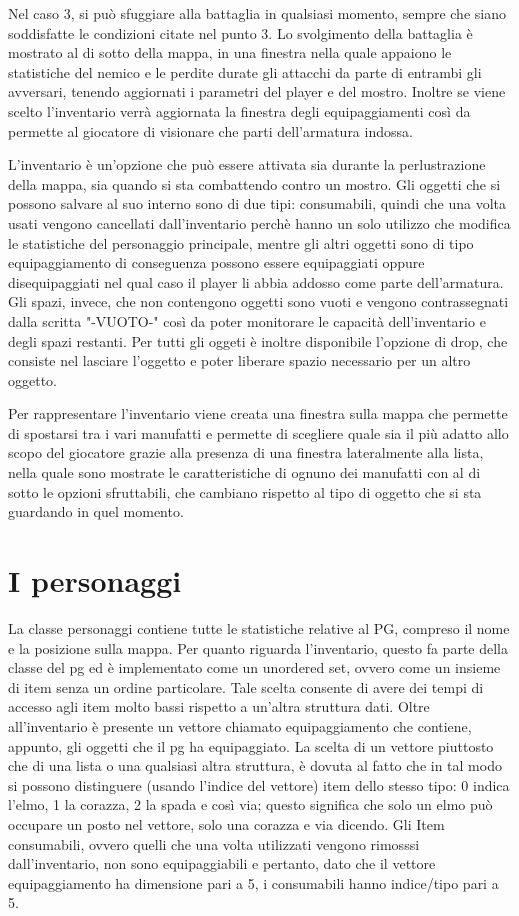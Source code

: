 \documentclass[10pt]{report}
\begin{document}
Nel caso 3, si può sfuggiare alla battaglia in qualsiasi momento, sempre che siano soddisfatte le condizioni citate nel
punto 3.  Lo svolgimento della battaglia è mostrato al di sotto della mappa, in una finestra nella quale appaiono le
statistiche del nemico e le perdite durate gli attacchi da parte di entrambi gli avversari, tenendo aggiornati i
parametri del player e del mostro. Inoltre se viene scelto l'inventario verrà aggiornata la finestra degli
equipaggiamenti così da permette al giocatore di visionare che parti dell'armatura indossa. 

L'inventario è un'opzione che può essere attivata sia durante la perlustrazione della mappa, sia quando si sta
combattendo contro un mostro. Gli oggetti che si possono salvare al suo interno sono di due tipi: consumabili, quindi
che una volta usati vengono cancellati dall'inventario perchè hanno un solo utilizzo che modifica le statistiche del
personaggio principale, mentre gli altri oggetti sono di tipo equipaggiamento di conseguenza possono essere equipaggiati
oppure disequipaggiati nel qual caso il player li abbia addosso come parte dell'armatura. Gli spazi, invece, che non
contengono oggetti sono vuoti e vengono contrassegnati dalla scritta "-VUOTO-" così da poter monitorare le capacità
dell'inventario e degli spazi restanti. Per tutti gli oggeti è inoltre disponibile l'opzione di drop, che consiste nel
lasciare l'oggetto e poter liberare spazio necessario per un altro oggetto. 

Per rappresentare l'inventario viene creata una finestra sulla mappa che permette di spostarsi tra i vari manufatti e
permette di scegliere quale sia il più adatto allo scopo del giocatore grazie alla presenza di una finestra lateralmente
alla lista, nella quale sono mostrate le caratteristiche di ognuno dei manufatti con al di sotto le opzioni sfruttabili,
che cambiano rispetto al tipo di oggetto che si sta guardando in quel momento.

\section{I personaggi}

La classe personaggi contiene tutte le statistiche relative al PG, compreso il nome e la posizione sulla
mappa. 
Per quanto riguarda l'inventario, questo fa parte della classe del pg ed è implementato come un 
unordered set, ovvero come un insieme di item senza un ordine particolare. Tale scelta consente di avere
dei tempi di accesso agli item molto bassi rispetto a un'altra struttura dati. 
Oltre all'inventario è presente un vettore chiamato equipaggiamento che contiene, appunto,
gli oggetti che il pg ha equipaggiato. La scelta di un vettore piuttosto che di una lista o una qualsiasi
altra struttura, è dovuta al fatto che in tal modo si possono distinguere (usando l'indice del vettore) 
item dello stesso tipo: 0 indica l'elmo, 1 la corazza, 2 la spada e così via; questo significa che solo
un elmo può occupare un posto nel vettore, solo una corazza e via dicendo. Gli Item consumabili, ovvero 
quelli che una volta utilizzati vengono rimosssi dall'inventario, non sono equipaggiabili e pertanto, 
dato che il vettore equipaggiamento ha dimensione pari a 5, i consumabili hanno indice/tipo pari a 5.
\end{document}
